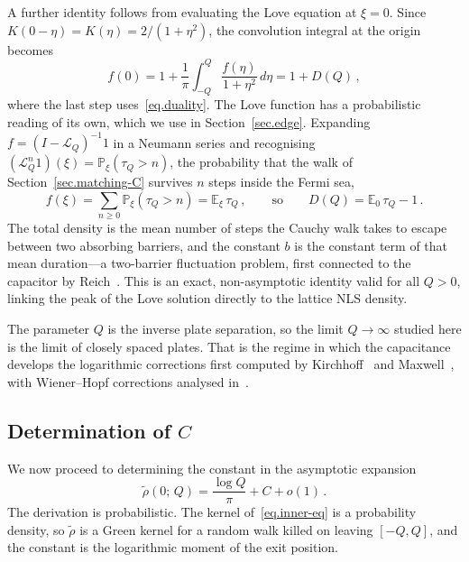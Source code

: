 \documentclass[11pt,a4paper]{article}
\theoremstyle{definition}
\begin{document}
A further identity follows from evaluating the Love equation
at $\xi = 0$.  Since $K(0-\eta) = K(\eta) = 2/(1+\eta^2)$, the
convolution integral at the origin becomes
\begin{equation}\label{eq.love-peak}
  f(0)
  = 1 + \frac{1}{\pi}\int_{-Q}^{Q}\frac{f(\eta)}{1+\eta^2}\,d\eta
  = 1 + D(Q)\,,
\end{equation}
where the last step uses~\eqref{eq.duality}. The Love function has a
probabilistic reading of its own, which we use in
Section~\ref{sec.edge}.  Expanding
$f = (I-\mathcal{L}_Q)^{-1}1$ in a Neumann series and recognising
$(\mathcal{L}_Q^n 1)(\xi) = \mathbb{P}_\xi(\tau_Q > n)$, the probability that
the walk of Section~\ref{sec.matching-C} survives $n$ steps inside the Fermi
sea,
\begin{equation}\label{eq.love-exit-time}
  f(\xi) = \sum_{n\geq0}\mathbb{P}_\xi(\tau_Q > n) = \mathbb{E}_\xi\,\tau_Q\,,
  \qquad\text{so}\qquad
  D(Q) = \mathbb{E}_0\,\tau_Q - 1\,.
\end{equation}
The total density is the mean number of steps the Cauchy walk takes to escape
between two absorbing barriers, and the constant $b$ is the constant term of
that mean duration---a two-barrier fluctuation problem, first connected to the
capacitor by Reich~\cite{Reich1953}.  This is an exact,
non-asymptotic identity valid for all $Q > 0$, linking the peak of the
Love solution directly to the lattice NLS density.

The parameter $Q$ is the inverse plate separation, so the limit
$Q \to \infty$ studied here is the limit of closely spaced plates.  That
is the regime in which the capacitance develops the logarithmic corrections
first computed by Kirchhoff~\cite{Kirchhoff1877} and
Maxwell~\cite{Maxwell1873}, with Wiener--Hopf corrections analysed
in~\cite{Hutson1963}.

\subsection{Determination of \texorpdfstring{$C$}{C}}
\label{sec.constant}
We now proceed to determining  the constant in the asymptotic expansion
\begin{equation}\label{eq.rho0-expansion}
  \tilde\rho(0;\,Q) = \frac{\log Q}{\pi} + C + o(1)\,.
\end{equation}
The derivation is probabilistic.  The kernel of~\eqref{eq.inner-eq} is a
probability density, so $\tilde\rho$ is a Green kernel for a random walk killed
on leaving $[-Q,Q]$, and the constant is the logarithmic moment of the exit
position.  
\end{document}
